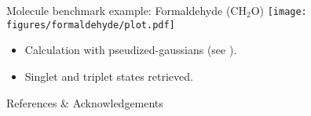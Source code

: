 \documentclass[final]{beamer}
\begin{document}
\begin{frame}[fragile]{}
\begin{columns}[t]
\begin{column}{.49\linewidth}
      \begin{block}{\large Molecule benchmark example: Formaldehyde (CH$_2$O)}
          \texttt{[image: figures/formaldehyde/plot.pdf]}
          \begin{itemize}
            \item
              Calculation with pseudized-gaussians
                (see \cite{10.10631.4961301}).
            \item
              Singlet and triplet states retrieved.
          \end{itemize}
      \end{block}

      \begin{block}{\large References \& Acknowledgements}
        \printbibliography
      \end{block}

    \end{column}

  \end{columns}

\end{frame}
\end{document}

